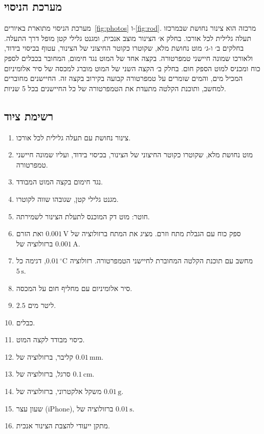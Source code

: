 \documentclass[10pt,a4paper]{article}
\newcommand{\textenglish}[1]{\foreignlanguage{english}{#1}}
\newcommand{\U}[1]{\,\mathrm{#1}}
\begin{document}
\subsection*{מערכת הניסוי}
מערכת הניסוי מתוארת באיורים~\ref{fig:photos} ו-\ref{fig:rod}. מרכזה הוא צינור נחושת שבמרכזו תעלה גלילית לכל אורכו. בחלק א׳ הצינור מוצב אנכית, ומגנט גלילי קטן מופל דרך התעלה. בחלקים ב׳ ו-ג׳ מוט נחושת מלא, שקוטרו כקוטר החיצוני של הצינור, עטוף בכיסוי בידוד, ולאורכו שמונה חיישני טמפרטורה. בקצה אחד של המוט נגד חימום, המחובר בכבלים לספק כוח ומכניס למוט הספק חום. בחלק ב׳ הקצה השני של המוט מוברג למכסה של סיר אלומיניום המכיל מים, והמים שומרים על טמפרטורה קבועה בקירוב בקצה זה. החיישנים מחוברים למחשב, ותוכנת הקלטה מתעדת את הטמפרטורה של כל החיישנים בכל 5 שניות.

\subsection*{רשימת ציוד}
\begin{enumerate}\setlength{\itemsep}{0pt}\setlength{\parskip}{0pt}
  \item צינור נחושת עם תעלה גלילית לכל אורכו.
  \item מוט נחושת מלא, שקוטרו כקוטר החיצוני של הצינור, בכיסוי בידוד, ועליו שמונה חיישני טמפרטורה.
  \item נגד חימום בקצה המוט המבודד.
  \item מגנט גלילי קטן, שגובהו שווה לקוטרו.
  \item חוטר: מוט דק המוכנס לתעלת הצינור לשמירתה.
  \item ספק כוח עם הגבלת מתח וזרם. מציג את המתח ברזולוציה של $0.001\U{V}$ ואת הזרם ברזולוציה של $0.001\U{A}$.
  \item מחשב עם תוכנת הקלטה המחוברת לחיישני הטמפרטורה. רזולוציה $0.01\U{^\circ C}$, דגימה כל $5\U{s}$.
  \item סיר אלומיניום עם מחליף חום על המכסה.
  \item $2.5$ ליטר מים.
  \item כבלים.
  \item כיסוי מבודד לקצה המוט.
  \item קליבר, ברזולוציה של $0.01\U{mm}$.
  \item סרגל, ברזולוציה של $0.1\U{cm}$.
  \item משקל אלקטרוני, ברזולוציה של $0.01\U{g}$.
  \item שעון עצר (\textenglish{iPhone}), ברזולוציה של $0.01\U{s}$.
  \item מתקן ייעודי להצבת הצינור אנכית.
\end{enumerate}
\end{document}
